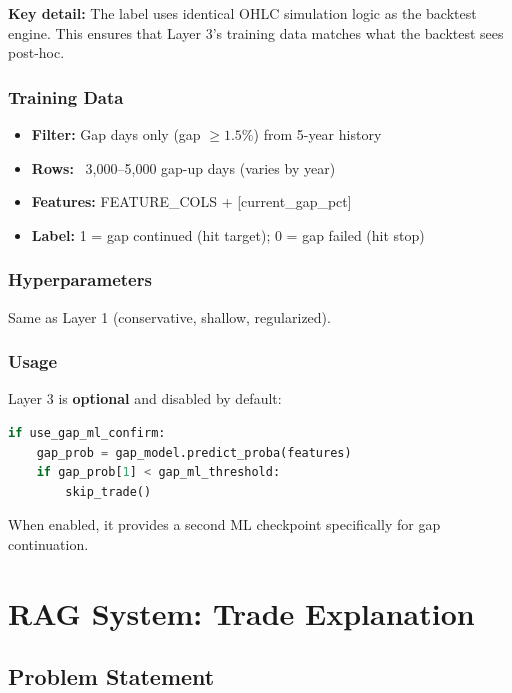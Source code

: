 \documentclass[11pt,a4paper]{article}
\begin{document}
\textbf{Key detail:} The label uses identical OHLC simulation logic as the backtest engine. This ensures that Layer 3's training data matches what the backtest sees post-hoc.

\subsubsection{Training Data}

\begin{itemize}
    \item \textbf{Filter:} Gap days only (gap $\geq 1.5\%$) from 5-year history
    \item \textbf{Rows:} ~3,000–5,000 gap-up days (varies by year)
    \item \textbf{Features:} FEATURE\_COLS + [current\_gap\_pct]
    \item \textbf{Label:} 1 = gap continued (hit target); 0 = gap failed (hit stop)
\end{itemize}

\subsubsection{Hyperparameters}

Same as Layer 1 (conservative, shallow, regularized).

\subsubsection{Usage}

Layer 3 is \textbf{optional} and disabled by default:

\begin{lstlisting}[language=Python, caption=Conditional Gap Confirmation]
if use_gap_ml_confirm:
    gap_prob = gap_model.predict_proba(features)
    if gap_prob[1] < gap_ml_threshold:
        skip_trade()
\end{lstlisting}

When enabled, it provides a second ML checkpoint specifically for gap continuation.

\section{RAG System: Trade Explanation}

\subsection{Problem Statement}
\end{document}
